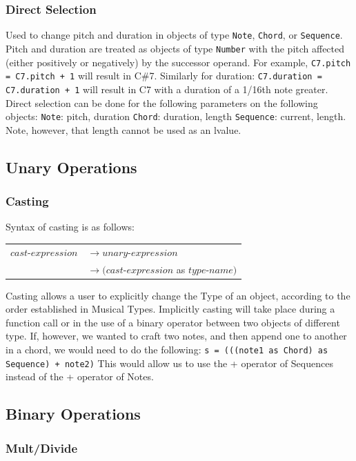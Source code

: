 \documentclass[12pt,A4]{book}
\begin{document}
\subsubsection{Direct Selection}
Used to change pitch and duration in objects of type \verb|Note|, \verb|Chord|, or \verb|Sequence|. Pitch and duration are treated as objects of type  \verb|Number| with the pitch affected (either positively or negatively) by the successor operand. For example, \verb|C7.pitch = C7.pitch + 1| will result in C\#7.
Similarly for duration: \verb|C7.duration = C7.duration + 1| will result in C7 with a duration of a 1/16th note greater.
Direct selection can be done for the following parameters on the following objects:
\verb|Note|: pitch, duration
\verb|Chord|: duration, length
\verb|Sequence|: current, length.  
Note, however, that length cannot be used as an lvalue.

\subsection{Unary Operations}
\subsubsection{Casting}
Syntax of casting is as follows:

\begin{tabular}{l l}
$cast\mbox{-}expression$  & $\rightarrow unary\mbox{-}expression$ \\
& $\rightarrow (cast\mbox{-}expression$ as $type\mbox{-}name)$ 
\end{tabular}

Casting allows a user to explicitly change the Type of an object, according to the order established in Musical Types. Implicitly casting will take place during a function call or in the use of a binary operator between two objects of different type. If, however, we wanted to craft two notes, and then append one to another in a chord, we would need to do the following:
\verb|s = (((note1 as Chord) as Sequence) + note2)|
This would allow us to use the + operator of Sequences instead of the + operator of Notes.
\subsection{Binary Operations}


\subsubsection{Mult/Divide}
\end{document}
